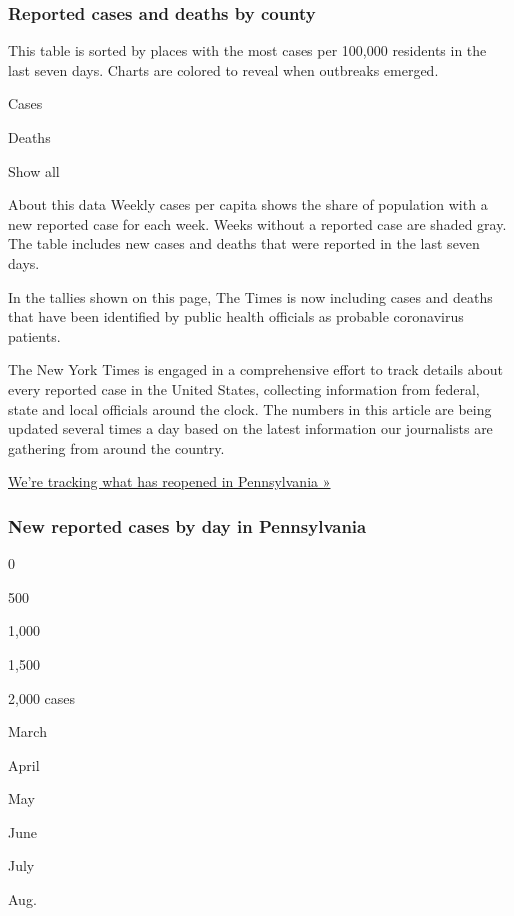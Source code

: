 \hypertarget{reported-cases-and-deaths-by-county}{%
\subsubsection{Reported cases and deaths by
county}\label{reported-cases-and-deaths-by-county}}

This table is sorted by places with the most cases per 100,000 residents
in the last seven days. Charts are colored to reveal when outbreaks
emerged.

Cases

Deaths

Show all

About this data Weekly cases per capita shows the share of population
with a new reported case for each week. Weeks without a reported case
are shaded gray. The table includes new cases and deaths that were
reported in the last seven days.

In the tallies shown on this page, The Times is now including cases and
deaths that have been identified by public health officials as probable
coronavirus patients.

The New York Times is engaged in a comprehensive effort to track details
about every reported case in the United States, collecting information
from federal, state and local officials around the clock. The numbers in
this article are being updated several times a day based on the latest
information our journalists are gathering from around the country.

\href{https://www.nytimes.com/interactive/2020/us/states-reopen-map-coronavirus.html}{We're
tracking what has reopened in Pennsylvania »}

\hypertarget{new-reported-cases-by-day-in-pennsylvania}{%
\subsubsection{New reported cases by day in
Pennsylvania}\label{new-reported-cases-by-day-in-pennsylvania}}

0

500

1,000

1,500

2,000 cases

March

April

May

June

July

Aug.

